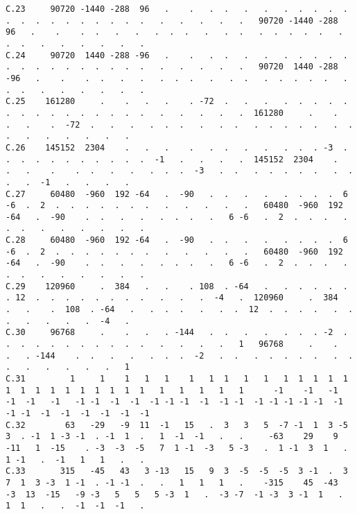 \begin{verbatim}
C.23     90720 -1440 -288  96   .    .   .  .   .   .   .  .  .  .  .  .  .  .  .  .  .  .  .  .  .   .   .   .   .   .   90720 -1440 -288  96   .    .    .  .   .   .   .  .  .   .   .  .   .  .  .  .  .   .  .  .   .   .   .   .   .   .
C.24     90720  1440 -288 -96   .    .   .  .   .   .   .  .  .  .  .  .  .  .  .  .  .  .  .  .  .   .   .   .   .   .   90720  1440 -288 -96   .    .    .  .   .   .   .  .  .   .   .  .   .  .  .  .  .   .  .  .   .   .   .   .   .   .
C.25    161280     .    .   .   .    . -72  .   .   .   .  .  .  .  .  .  .  .  .  .  .  .  .  .  .   .   .   .   .   .  161280     .    .   .   .    .  -72  .   .   .   .  .  .   .   .  .   .  .  .  .  .   .  .  .   .   .   .   .   .   .
C.26    145152  2304    .   .   .    .   .  .   .   .   .  .  . -3  .  .  .  .  .  .  .  .  .  .  .  -1   .   .   .   .  145152  2304    .   .   .    .    .  .   .   .   .  .  .  -3   .  .   .  .  .  .  .   .  .  .   .  -1   .   .   .   .
C.27     60480  -960  192 -64   .  -90   .  .   .   .   .  .  .  .  6 -6  .  2  .  .  .  .  .  .  .   .   .   .   .   .   60480  -960  192 -64   .  -90    .  .   .   .   .  .  .   .   6 -6   .  2  .  .  .   .  .  .   .   .   .   .   .   .
C.28     60480  -960  192 -64   .  -90   .  .   .   .   .  .  .  .  6 -6  .  2  .  .  .  .  .  .  .   .   .   .   .   .   60480  -960  192 -64   .  -90    .  .   .   .   .  .  .   .   6 -6   .  2  .  .  .   .  .  .   .   .   .   .   .   .
C.29    120960     .  384   .   .    . 108  . -64   .   .  .  .  .  .  . 12  .  .  .  .  .  .  .  .   .   .   .  -4   .  120960     .  384   .   .    .  108  . -64   .   .  .  .   .   .  .  12  .  .  .  .   .  .  .   .   .   .   .  -4   .
C.30     96768     .    .   .   . -144   .  .   .   .   .  .  . -2  .  .  .  .  .  .  .  .  .  .  .   .   .   .   .   1   96768     .    .   .   . -144    .  .   .   .   .  .  .  -2   .  .   .  .  .  .  .   .  .  .   .   .   .   .   .   1
C.31         1     1    1   1   1    1   1  1   1   1   1  1  1  1  1  1  1  1  1  1  1  1  1  1  1   1   1   1   1   1      -1    -1   -1  -1  -1   -1   -1 -1  -1  -1  -1 -1 -1  -1  -1 -1  -1 -1 -1 -1 -1  -1 -1 -1  -1  -1  -1  -1  -1  -1
C.32        63   -29   -9  11  -1   15   .  3   3   5  -7 -1  1  3 -5  3  . -1  1 -3 -1  . -1  1  .   1  -1  -1   .   .     -63    29    9 -11   1  -15    . -3  -3  -5   7  1 -1  -3   5 -3   .  1 -1  3  1   .  1 -1   .  -1   1   1   .   .
C.33       315   -45   43   3 -13   15   9  3  -5  -5  -5  3 -1  .  3  7  1  3 -3  1 -1  . -1 -1  .   .   1   1   1   .    -315    45  -43  -3  13  -15   -9 -3   5   5   5 -3  1   .  -3 -7  -1 -3  3 -1  1   .  1  1   .   .  -1  -1  -1   .

\end{verbatim}
